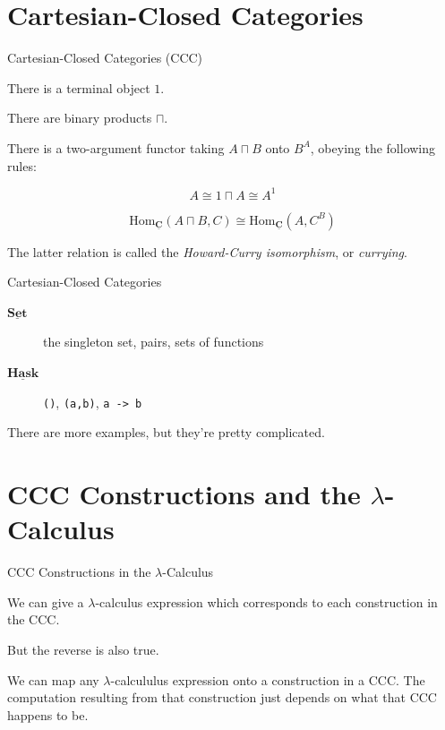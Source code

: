 \documentclass[10pt]{beamer}
\newcommand{\Cat}[1]{\ensuremath{\underline{\mathbf{#1}}}}
\newcommand{\Hom}[3]{\ensuremath{\mathrm{Hom}_{\Cat{#1}}(#2,#3)}}
\newcommand{\Com}[3]{#3^{#2}}
\newcommand{\eqnlabel}[1]{\label{eq:#1}}
\theoremstyle{definition}
\theoremstyle{remark}
\numberwithin{equation}{section}
\begin{document}
\section{Cartesian-Closed Categories}

\begin{frame}[fragile]{Cartesian-Closed Categories (CCC)}

  There is a terminal object $1$.

  There are binary products $\sqcap$.

  There is a two-argument functor taking $A \sqcap B$ onto $\Com{C}{A}{B}$, obeying the following rules:
  
  \[
    A \cong 1 \sqcap A \cong \Com{C}{1}{A}
  \]
  
  \begin{equation}
  \Hom{C}{A\sqcap B}{C} \cong \Hom{C}{A}{\Com{C}{B}{C}} \eqnlabel{exp1}
  \end{equation}

  The latter relation is called the \emph{Howard-Curry isomorphism}, or \emph{currying}.
\end{frame}

\begin{frame}[fragile]{Cartesian-Closed Categories}

  \begin{description}
    \item[\Cat{Set}] the singleton set, pairs, sets of functions
    \item[\Cat{Hask}] \lstinline{()}, \lstinline{(a,b)}, \lstinline{a -> b}
  \end{description}

  There are more examples, but they're pretty complicated.

\end{frame}

\section{CCC Constructions and the $\lambda$-Calculus} %

\begin{frame}[fragile]{CCC Constructions in the $\lambda$-Calculus}

  We can give a $\lambda$-calculus expression which corresponds to each construction in the CCC.

  But the reverse is also true.

  We can map any $\lambda$-calcululus expression onto a construction in a CCC. The computation resulting from that construction just depends on what that CCC happens to be.
  
\end{frame}
\end{document}
